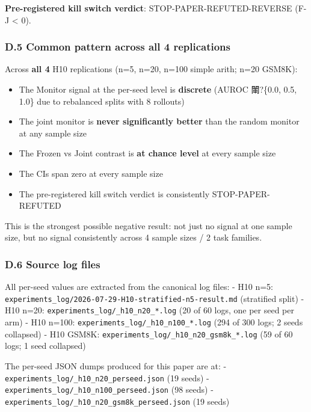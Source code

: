 \documentclass[11pt]{article}
\begin{document}
\textbf{Pre-registered kill switch verdict}: STOP-PAPER-REFUTED-REVERSE
(F-J \textless{} 0).

\subsubsection{D.5 Common pattern across all 4
replications}\label{d.5-common-pattern-across-all-4-replications}

Across \textbf{all 4} H10 replications (n=5, n=20, n=100 simple arith;
n=20 GSM8K):

\begin{itemize}

\item
  The Monitor signal at the per-seed level is \textbf{discrete} (AUROC
  閳?\{0.0, 0.5, 1.0\} due to rebalanced splits with 8 rollouts)
\item
  The joint monitor is \textbf{never significantly better} than the
  random monitor at any sample size
\item
  The Frozen vs Joint contrast is \textbf{at chance level} at every
  sample size
\item
  The CIs span zero at every sample size
\item
  The pre-registered kill switch verdict is consistently
  STOP-PAPER-REFUTED
\end{itemize}

This is the strongest possible negative result: not just no signal at
one sample size, but no signal consistently across 4 sample sizes / 2
task families.

\subsubsection{D.6 Source log files}\label{d.6-source-log-files}

All per-seed values are extracted from the canonical log files: - H10
n=5: \texttt{experiments\_log/2026-07-29-H10-stratified-n5-result.md}
(stratified split) - H10 n=20:
\texttt{experiments\_log/\_h10\_n20\_*.log} (20 of 60 logs, one per seed
per arm) - H10 n=100: \texttt{experiments\_log/\_h10\_n100\_*.log} (294
of 300 logs; 2 seeds collapsed) - H10 GSM8K:
\texttt{experiments\_log/\_h10\_n20\_gsm8k\_*.log} (59 of 60 logs; 1
seed collapsed)

The per-seed JSON dumps produced for this paper are at: -
\texttt{experiments\_log/\_h10\_n20\_perseed.json} (19 seeds) -
\texttt{experiments\_log/\_h10\_n100\_perseed.json} (98 seeds) -
\texttt{experiments\_log/\_h10\_n20\_gsm8k\_perseed.json} (19 seeds)
\end{document}
